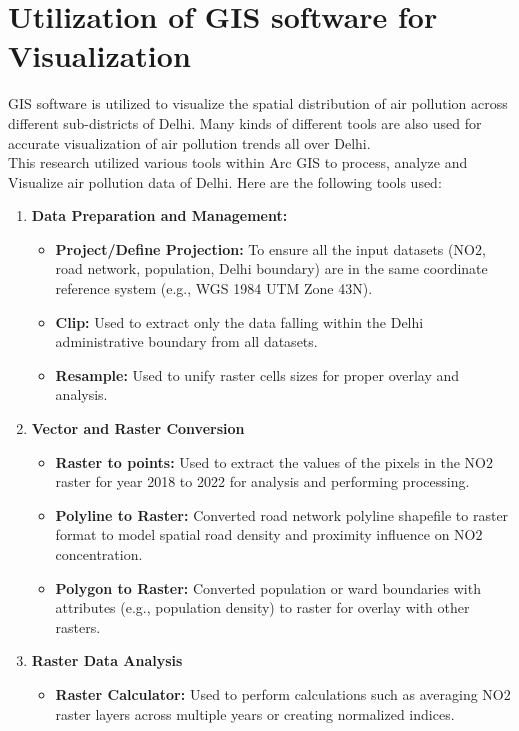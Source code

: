 \documentclass[12pt]{report}
\begin{document}
\section{Utilization of GIS software for Visualization}
GIS software is utilized to visualize the spatial distribution of air pollution across different sub-districts of Delhi. Many kinds of different tools are also used for accurate visualization of air pollution trends all over Delhi.\\
This research utilized various tools within Arc GIS to process, analyze and Visualize air pollution data of Delhi. Here are the following tools used:
\begin{enumerate}
    \item \textbf{Data Preparation and Management: }
    \begin{itemize}
        \item \textbf{Project/Define Projection:} To ensure all the input datasets (NO$2$, road network, population, Delhi boundary) are in the same coordinate reference system (e.g., WGS 1984 UTM Zone 43N).
        \item \textbf{Clip:} Used to extract only the data falling within the Delhi administrative boundary from all datasets.
        \item \textbf{Resample:} Used to unify raster cells sizes for proper overlay and analysis.
    \end{itemize}
    \item \textbf{Vector and Raster Conversion}
    \begin{itemize}
        \item \textbf{Raster to points:} Used to extract the values of the pixels in the NO$2$ raster for year 2018 to 2022 for analysis and performing processing.
        \item \textbf{Polyline to Raster:} Converted road network polyline shapefile to raster format to model spatial road density and proximity influence on NO$2$ concentration.
        \item \textbf{Polygon to Raster:} Converted population or ward boundaries with attributes (e.g., population density) to raster for overlay with other rasters.
    \end{itemize}
    \item \textbf{Raster Data Analysis}
    \begin{itemize}
        \item \textbf{Raster Calculator:} Used to perform calculations such as averaging NO$2$ raster layers across multiple years or creating normalized indices.

\end{itemize}
\end{enumerate}
\end{document}
